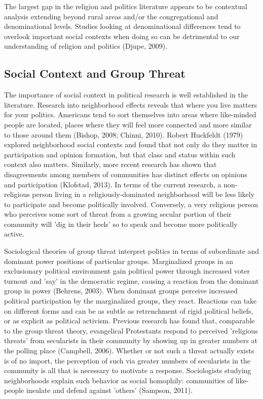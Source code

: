\documentclass{article}
\begin{document}
The largest gap in the religion and politics literature appears to be contextual analysis extending beyond rural areas and/or the congregational and denominational levels.  Studies looking at denominational differences tend to overlook important social contexts when doing so can be detrimental to our understanding of religion and politics (Djupe, 2009).

\subsection{Social Context and Group Threat}
The importance of social context in political research is well established in the literature.  Research into neighborhood effects reveals that where you live matters for your politics.  Americans tend to sort themselves into areas where like-minded people are located, places where they will feel more connected and more similar to those around them (Bishop, 2008; Chinni, 2010).  Robert Huckfeldt (1979) explored neighborhood social contexts and found that not only do they matter in participation and opinion formation, but that class and status within such context also matters.  Similarly, more recent research has shown that disagreements among members of communities has distinct effects on opinions and participation (Klofstad, 2013).  In terms of the current research, a non-religious person living in a religiously-dominated neighborhood will be less likely to participate and become politically involved.  Conversely, a very religious person who perceives some sort of threat from a growing secular portion of their community will 'dig in their heels' so to speak and become more politically active. 

Sociological theories of group threat interpret politics in terms of subordinate and dominant power positions of particular groups.  Marginalized groups in an exclusionary political environment gain political power through increased voter turnout and 'say' in the democratic regime, causing a reaction from the dominant group in power (Behrens, 2003).  When dominant groups perceive increased political participation by the marginalized groups, they react.  Reactions can take on different forms and can be as subtle as retrenchment of rigid political beliefs, or as explicit as political activism.  Previous research has found that, comparable to the group threat theory, evangelical Protestants respond to perceived 'religious threats' from secularists in their community by showing up in greater numbers at the polling place (Campbell, 2006).  Whether or not such a threat actually exists is of no import, the perception of such via greater numbers of secularists in the community is all that is necessary to motivate a response.  Sociologists studying neighborhoods explain such behavior as social homophily: communities of like-people insulate and defend against 'others' (Sampson, 2011).
\end{document}
